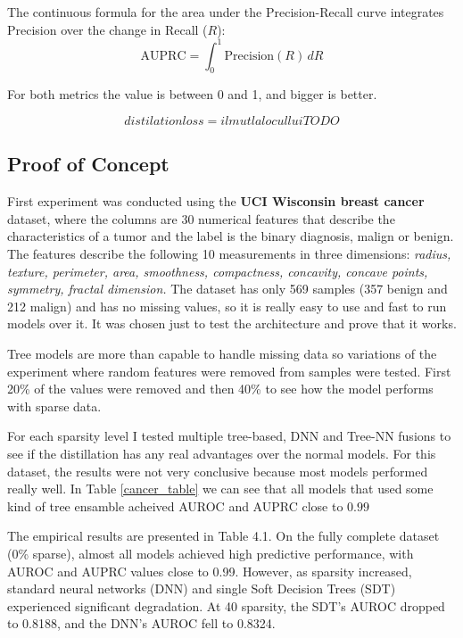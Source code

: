 The continuous formula for the area under the Precision-Recall curve integrates Precision over the change in Recall ($R$):
\begin{equation}
    \mathrm{AUPRC} = \int_{0}^{1} \mathrm{Precision}(R) \, dR
\end{equation}

For both metrics the value is between 0 and 1, and bigger is better.

\begin{equation}
    distilation loss = il mut la locul lui TODO
    \label{distilation_loss}
\end{equation}

\subsection{Proof of Concept}
First experiment was conducted using the \textbf{UCI Wisconsin breast cancer} dataset, where the columns are 30 numerical features that describe the characteristics of a tumor and the label is the binary diagnosis, malign or benign. The features describe the following 10 measurements in three dimensions: \textit{radius, texture, perimeter, area, smoothness, compactness, concavity, concave points, symmetry, fractal dimension.}
The dataset has only 569 samples (357 benign and 212 malign) and has no missing values, so it is really easy to use and fast to run models over it. It was chosen just to test the architecture and prove that it works.

Tree models are more than capable to handle missing data so variations of the experiment where random features were removed from samples were tested. First 20\% of the values were removed and then 40\% to see how the model performs with sparse data.

For each sparsity level I tested multiple tree-based, DNN and Tree-NN fusions to see if the distillation has any real advantages over the normal models. For this dataset, the results were not very conclusive because most models performed really well. In Table \ref{cancer_table} we can see that all models that used some kind of tree ensamble acheived AUROC and AUPRC close to $0.99$

The empirical results are presented in Table 4.1. On the fully complete dataset
(0\% sparse), almost all models achieved high predictive performance, with AUROC and
AUPRC values close to 0.99. However, as sparsity increased, standard neural networks
(DNN) and single Soft Decision Trees (SDT) experienced significant degradation. At 40%
sparsity, the SDT’s AUROC dropped to 0.8188, and the DNN’s AUROC fell to 0.8324.

